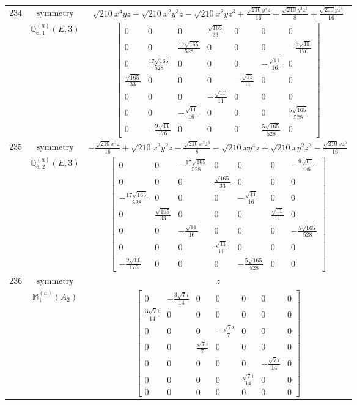 \documentclass[fleqn,8pt,landscape]{jsarticle}
\begin{document}
\begin{longtable}{ccc}
$ 234 $ & $ \text{symmetry} $ & $ \sqrt{210} x^{4} y z - \sqrt{210} x^{2} y^{3} z - \sqrt{210} x^{2} y z^{3} + \frac{\sqrt{210} y^{5} z}{16} + \frac{\sqrt{210} y^{3} z^{3}}{8} + \frac{\sqrt{210} y z^{5}}{16} $ \\
$  $ & $ \mathbb{Q}_{6,1}^{(a)}(E,3) $ & $ \begin{bmatrix} 0 & 0 & 0 & \frac{\sqrt{165}}{33} & 0 & 0 & 0 \\ 0 & 0 & \frac{17 \sqrt{165}}{528} & 0 & 0 & 0 & - \frac{9 \sqrt{11}}{176} \\ 0 & \frac{17 \sqrt{165}}{528} & 0 & 0 & 0 & - \frac{\sqrt{11}}{16} & 0 \\ \frac{\sqrt{165}}{33} & 0 & 0 & 0 & - \frac{\sqrt{11}}{11} & 0 & 0 \\ 0 & 0 & 0 & - \frac{\sqrt{11}}{11} & 0 & 0 & 0 \\ 0 & 0 & - \frac{\sqrt{11}}{16} & 0 & 0 & 0 & \frac{5 \sqrt{165}}{528} \\ 0 & - \frac{9 \sqrt{11}}{176} & 0 & 0 & 0 & \frac{5 \sqrt{165}}{528} & 0 \end{bmatrix} $ \\ \hline
$ 235 $ & $ \text{symmetry} $ & $ - \frac{\sqrt{210} x^{5} z}{16} + \sqrt{210} x^{3} y^{2} z - \frac{\sqrt{210} x^{3} z^{3}}{8} - \sqrt{210} x y^{4} z + \sqrt{210} x y^{2} z^{3} - \frac{\sqrt{210} x z^{5}}{16} $ \\
$  $ & $ \mathbb{Q}_{6,2}^{(a)}(E,3) $ & $ \begin{bmatrix} 0 & 0 & - \frac{17 \sqrt{165}}{528} & 0 & 0 & 0 & - \frac{9 \sqrt{11}}{176} \\ 0 & 0 & 0 & \frac{\sqrt{165}}{33} & 0 & 0 & 0 \\ - \frac{17 \sqrt{165}}{528} & 0 & 0 & 0 & - \frac{\sqrt{11}}{16} & 0 & 0 \\ 0 & \frac{\sqrt{165}}{33} & 0 & 0 & 0 & \frac{\sqrt{11}}{11} & 0 \\ 0 & 0 & - \frac{\sqrt{11}}{16} & 0 & 0 & 0 & - \frac{5 \sqrt{165}}{528} \\ 0 & 0 & 0 & \frac{\sqrt{11}}{11} & 0 & 0 & 0 \\ - \frac{9 \sqrt{11}}{176} & 0 & 0 & 0 & - \frac{5 \sqrt{165}}{528} & 0 & 0 \end{bmatrix} $ \\ \hline
$ 236 $ & $ \text{symmetry} $ & $ z $ \\
$  $ & $ \mathbb{M}_{1}^{(a)}(A_{2}) $ & $ \begin{bmatrix} 0 & - \frac{3 \sqrt{7} i}{14} & 0 & 0 & 0 & 0 & 0 \\ \frac{3 \sqrt{7} i}{14} & 0 & 0 & 0 & 0 & 0 & 0 \\ 0 & 0 & 0 & - \frac{\sqrt{7} i}{7} & 0 & 0 & 0 \\ 0 & 0 & \frac{\sqrt{7} i}{7} & 0 & 0 & 0 & 0 \\ 0 & 0 & 0 & 0 & 0 & - \frac{\sqrt{7} i}{14} & 0 \\ 0 & 0 & 0 & 0 & \frac{\sqrt{7} i}{14} & 0 & 0 \\ 0 & 0 & 0 & 0 & 0 & 0 & 0 \end{bmatrix} $ \\ \hline

\end{longtable}
\end{document}
